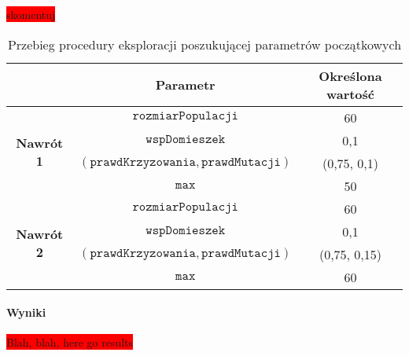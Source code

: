 \documentclass[twoside]{iisthesis}
\newcommand{\todo}{\colorbox{red}}
\newcommand{\param}[1]{\mathtt{#1}}
\begin{document}
\todo{skomentuj}

\begin{table}[h]
	\caption{Przebieg procedury eksploracji poszukującej parametrów początkowych \label{table:knapsack_tweak_flow}}
	\centering
	\begin{tabular}{c|c|c|}
		\cline{2-3}
		& {\bf Parametr}                                     & {\bf Określona wartość} \\ \hline
		\multicolumn{1}{|c|}{\multirow{4}{*}{{\bf Nawrót 1}}} & $\param{rozmiarPopulacji}$                         & 60                      \\ \cline{2-3} 
		\multicolumn{1}{|c|}{}                                & $\param{wspDomieszek}$                             & 0,1                     \\ \cline{2-3} 
		\multicolumn{1}{|c|}{}                                & $(\param{prawdKrzyzowania}, \param{prawdMutacji})$ & (0,75, 0,1)             \\ \cline{2-3} 
		\multicolumn{1}{|c|}{}                                & $\param{max}$                                      & 50                     \\ \hline \hline
		\multicolumn{1}{|c|}{\multirow{4}{*}{{\bf Nawrót 2}}} & $\param{rozmiarPopulacji}$                         & 60                      \\ \cline{2-3} 
		\multicolumn{1}{|c|}{}                                & $\param{wspDomieszek}$                             & 0,1                     \\ \cline{2-3} 
		\multicolumn{1}{|c|}{}                                & $(\param{prawdKrzyzowania}, \param{prawdMutacji})$ & (0,75, 0,15)             \\ \cline{2-3} 
		\multicolumn{1}{|c|}{}                                & $\param{max}$                                      & 60                     \\ \hline
	\end{tabular}
\end{table}	

\paragraph{Wyniki}
\todo{Blah, blah, here go results}
\end{document}
